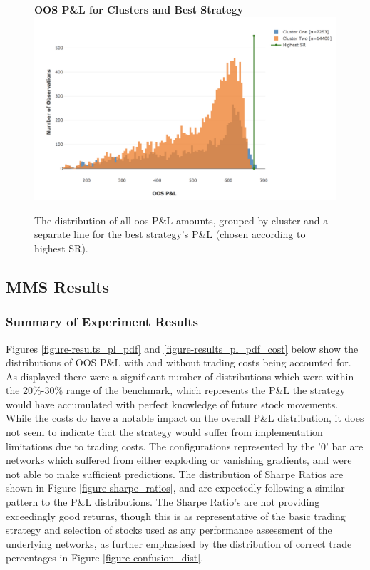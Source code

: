 \documentclass[a4paper,11pt,oneside]{article}
\theoremstyle{plain}
\theoremstyle{definition}
\begin{document}
\begin{figure}[H]
	\centering
	\textbf{OOS P\&L for Clusters and Best Strategy}
	\includegraphics[scale=0.35]{images/results/dsr/cluster_oos.png} 
	\caption{
		\newline The distribution of all oos P\&L amounts, grouped by cluster and a separate line for the best strategy's P\&L (chosen according to highest SR).}
	\label{figure-dsr_oos}
\end{figure}

\newpage
\subsection{MMS Results}\label{results_mms}


\subsubsection{Summary of Experiment Results}

Figures \ref{figure-results_pl_pdf} and \ref{figure-results_pl_pdf_cost} below show the distributions of OOS P\&L with and without trading costs being accounted for. As displayed there were a significant number of distributions which were within the 20\%-30\% range of the benchmark, which represents the P\&L the strategy would have accumulated with perfect knowledge of future stock movements. While the costs do have a notable impact on the overall P\&L distribution, it does not seem to indicate that the strategy would suffer from implementation limitations due to trading costs. The configurations represented by the '0' bar are networks which suffered from either exploding or vanishing gradients, and were not able to make sufficient predictions. The distribution of Sharpe Ratios are shown in Figure \ref{figure-sharpe_ratios}, and are expectedly following a similar pattern to the P\&L distributions. The Sharpe Ratio's are not providing exceedingly good returns, though this is as representative of the basic trading strategy and selection of stocks used as any performance assessment of the underlying networks, as further emphasised by the distribution of correct trade percentages in Figure \ref{figure-confusion_dist}. \newline 
\end{document}
